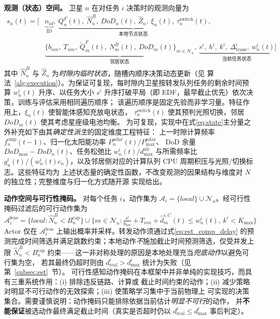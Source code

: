 \documentclass[a4paper,11pt]{article}
\begin{document}
\noindent\textbf{观测（状态）空间。}
卫星 $n$ 在对任务 $i$ 决策时的观测向量为
\begin{equation}
\begin{aligned}
s_n(t) = \Big[
&\underbrace{n_{id}}_{\text{ID}},\
\underbrace{Q^F_n(t),\ \hat{N}^B_n,\ DoD_n(t),\
\hat{Z}_n,\ \xi_n(t),\ \tau^{\mathrm{switch}}_n(t)}_{\text{本地节点状态}}, \\
&\underbrace{\{b_{nm},\ T_{nm},\ \tilde{Q}^F_m(t),\
N^B_m(t),\ DoD_m(t)\}_{m \in \mathcal{N}_n}}_{\text{邻居状态}},\
\underbrace{s^i,\ h^i,\ k^i,\ \Delta^i_{\mathrm{trans}},\
w^i_n(t)}_{\text{当前任务状态}}
\Big]
\label{eq:state}
\end{aligned}
\end{equation}
其中 $\hat{N}^B_n$ 与 $\hat{Z}_n$ 为\emph{时隙内临时状态}，随槽内顺序决策动态更新（见
算法~\ref{alg:execution}）。为保证可复现，每时隙内卫星按转发队列任务的剩余时间预算 $w^i_n(t)$
升序、以任务大小 $s^i$ 升序打破平局（即 EDF，最早截止优先）依次决策，训练与评估采用相同遍历顺序；
该遍历顺序是固定先验而非学习量。特征作用上，$\xi_n(t)$ 使智能体感知充放电状态，
$\tau^{\mathrm{switch}}_n(t)$ 使其预判光照切换，邻居 $DoD_m(t)$ 使其考虑星座级电池均衡。
为可复现，实现中在式\eqref{eq:state}主分量之外补充如下由其\emph{确定性派生}的固定维度工程特征：
上一时隙计算频率 $f^{\mathrm{cmp}}_n(t\!-\!1)$、归一化太阳能功率 $P^{\mathrm{solar}}_n(t)/P^{\mathrm{solar}}_{\max}$、
DoD 余量 $DoD_{\max}-DoD_n(t)$、任务松弛比 $w^i_n(t)/d^{\mathrm{ub}}_{\max}$ 与所需频率比
$g^i_n(t)/(w^i_n(t)c_n)$，以及邻居侧对应的计算队列 CPU 周期积压与光照/切换标志。这些特征均为
上述状态量的确定性函数，不改变观测的因果结构与维度对 $N$ 的独立性；完整维度与归一化方式随开源
实现给出。

\noindent\textbf{动作空间与可行性掩码。}
对每个任务 $i$，动作集为 $\mathcal{A}_i=\{local\}\cup\mathcal{N}_n$。经可行性掩码过滤后的可行动作集为
\begin{equation}
\mathcal{A}^{\mathrm{feas}}_i =
\big\{local : \hat{N}^B_n < B^{\mathrm{cap}}_n\big\}
\cup \Big\{m \in \mathcal{N}_n : \tfrac{s^i}{b_{nm}}+T_{nm}+\hat{d}^{i,C}_m(t) \le w^i_n(t),\ k^i < K_{\max}\Big\}
\label{eq:feasible_actions}
\end{equation}
Actor 仅在 $\mathcal{A}^{\mathrm{feas}}_i$ 上输出概率并采样。转发动作须通过式\eqref{eq:est_comp_delay}
的预测完成时间筛选并满足跳数约束；本地动作\emph{不}施加截止时间预测筛选，仅受并发上限
$\hat{N}^B_n<B^{\mathrm{cap}}_n$ 约束——这一非对称处理的原因是本地处理充当\emph{兜底动作}以避免可行集为空，
若其最终仍超时则由 $d^i_{\mathrm{real}}>d^i_{\max}$ 统计为失败（见第~\ref{subsec:est}~节）。
可行性感知动作掩码在本框架中并非单纯的实现技巧，而具有三重系统作用：(i) 排除违反链路、计算或
截止时间约束的动作；(ii) 减少策略对明显不可行动作的无效探索；(iii) 使策略学习集中于当前物理上
可实现的决策集合。需要谨慎说明：动作掩码只能排除依据当前估计\emph{明显不可行}的动作，
并\textbf{不能保证}被选动作最终满足截止时间（真实是否超时仍以 $d^i_{\mathrm{real}}\le d^i_{\max}$ 事后判定）。
\end{document}

